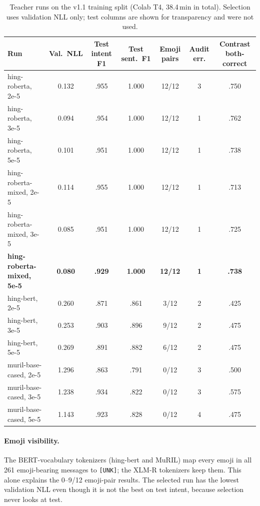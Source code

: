 \documentclass[11pt,a4paper]{article}
\theoremstyle{remark}
\begin{document}
\begin{table}[h]
\centering\small
\caption{Teacher runs on the v1.1 training split (Colab T4, 38.4\,min in total). Selection uses validation NLL only; test columns are shown for transparency and were not used.}
\label{tab:v12teacher1}
\setlength{\tabcolsep}{4pt}
\begin{tabular}{@{}l c c c c c c@{}}
\toprule
Run & Val.\ NLL & Test intent F1 & Test sent.\ F1 & Emoji pairs & Audit err. & Contrast both-correct \\
\midrule
hing-roberta, 2e-5          & 0.132 &.955 & 1.000 & 12/12 & 3 &.750 \\
hing-roberta, 3e-5          & 0.094 &.954 & 1.000 & 12/12 & 1 &.762 \\
hing-roberta, 5e-5          & 0.101 &.951 & 1.000 & 12/12 & 1 &.738 \\
hing-roberta-mixed, 2e-5    & 0.114 &.955 & 1.000 & 12/12 & 1 &.713 \\
hing-roberta-mixed, 3e-5    & 0.085 &.951 & 1.000 & 12/12 & 1 &.725 \\
\textbf{hing-roberta-mixed, 5e-5} & \textbf{0.080} & \textbf{.929} & \textbf{1.000} & \textbf{12/12} & \textbf{1} & \textbf{.738} \\
hing-bert, 2e-5             & 0.260 &.871 &.861 & 3/12 & 2 &.425 \\
hing-bert, 3e-5             & 0.253 &.903 &.896 & 9/12 & 2 &.475 \\
hing-bert, 5e-5             & 0.269 &.891 &.882 & 6/12 & 2 &.475 \\
muril-base-cased, 2e-5      & 1.296 &.863 &.791 & 0/12 & 3 &.500 \\
muril-base-cased, 3e-5      & 1.238 &.934 &.822 & 0/12 & 3 &.575 \\
muril-base-cased, 5e-5      & 1.143 &.923 &.828 & 0/12 & 4 &.475 \\
\bottomrule
\end{tabular}
\end{table}

\paragraph{Emoji visibility.} The BERT-vocabulary tokenizers (hing-bert and
MuRIL) map every emoji in all 261 emoji-bearing messages to \texttt{[UNK]}; the
XLM-R tokenizers keep them. This alone explains the 0--9/12 emoji-pair results.
The selected run has the lowest validation NLL even though it is not the best on
test intent, because selection never looks at test.
\end{document}
